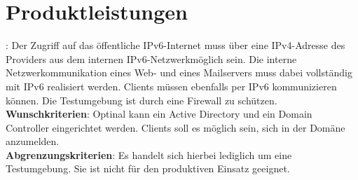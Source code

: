 \section{Produktleistungen}



: Der Zugriff auf das öffentliche IPv6-Internet muss über eine IPv4-Adresse des Providers aus dem internen IPv6-Netzwerkmöglich sein. Die interne Netzwerkommunikation eines Web- und eines Mailservers muss dabei vollständig mit IPv6 realisiert werden. Clients müssen ebenfalls per IPv6 kommunizieren können. Die Testumgebung ist durch eine Firewall zu schützen. \\
{\bf Wunschkriterien}: Optinal kann ein Active Directory und ein Domain Controller eingerichtet werden. Clients soll es möglich sein, sich in der Domäne anzumelden. \\
{\bf Abgrenzungskriterien}: Es handelt sich hierbei lediglich um eine Testumgebung. Sie ist nicht für den produktiven Einsatz geeignet.